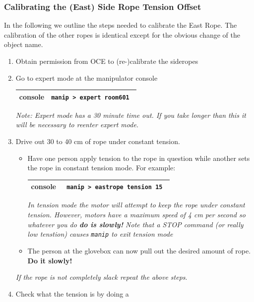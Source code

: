 \subsubsection{Calibrating the (East) Side Rope Tension Offset}
In the following we outline the steps needed to calibrate the East Rope. The calibration of the other ropes is identical except for the obvious change of the object name. 
\begin{enumerate}
\item \CheckBox[name=cesr1]{} Obtain permission from OCE to (re-)calibrate the sideropes
\item \CheckBox[name=cesr2]{} Go to expert mode at the manipulator console
\begin{center}
\begin{tabular}{|c|c|}
\hline
console & \verb+manip > expert room601 +\\
\hline
\end{tabular}
\end{center}
{\it Note: Expert mode has a 30 minute time out. If you take longer than this it will be necessary to reenter expert mode.}
\item \CheckBox[name=cesr3]{} Drive out 30 to 40 cm of rope under constant tension.
\begin{itemize}
\item Have one person apply tension to the rope in question while another sets the rope in constant tension mode. For example:
\begin{center}
\begin{tabular}{|c|c|}
\hline
console & \verb+ manip > eastrope tension 15 +\\
\hline
\end{tabular}
\end{center}
{\it In tension mode the motor will attempt to keep the rope under constant tension. However, motors have a maximum speed of 4 cm per second so whatever you do {\bf do is slowly!} Note that a STOP command (or really low tenstion) causes \verb+manip+ to exit tension mode}
\item The person at the glovebox can now pull out the desired amount of rope. {\bf Do it slowly!}
\end{itemize}
{\it If the rope is not completely slack repeat the above steps}.
\item \CheckBox[name=cesr4]{} Check what the tension is by doing a 

\end{enumerate}
